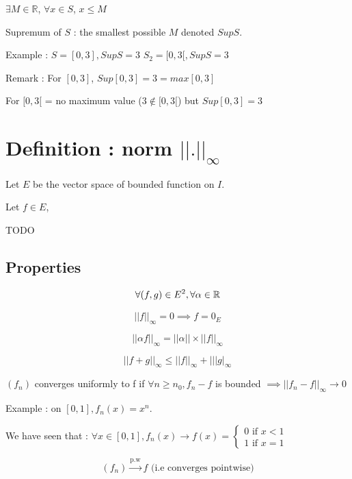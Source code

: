 \documentclass[a4paper,12pt]{article}
\renewcommand{\notin}{\mathrel{\not\in}}
\begin{document}
$\exists M \in \mathbb{R}$, $\forall x \in S$, $x \leq M$ \newline

Supremum of $S$ : the smallest possible $M$ denoted $Sup S$. \newline

Example : $S = [0,3], Sup S = 3$ \newline
$S_2 = [0,3[, Sup S = 3$ \newline

Remark : For $[0,3]$, $Sup [0,3] = 3 = max[0,3]$ \newline

For $[0,3[$ = no maximum value ($3 \notin [0,3[$) but $Sup [0,3] = 3$

\section{Definition : norm $||.||_\infty$}

Let $E$ be the vector space of bounded function on $I$. \newline

Let $f \in E$,

TODO 

\subsection{Properties}

\[
\forall (f,g) \in E^2, \forall \alpha \in \mathbb{R} \\
\]

\[
||f||_\infty = 0 \implies f = 0_E 
\]

\[
||\alpha f||_\infty = ||\alpha|| \times ||f||_\infty
\]

\[
||f + g||_\infty \leq ||f||_\infty + |||g|_\infty
\] \newline

$(f_n)$ converges uniformly to f if $\forall n \geq n_0, f_n - f$ is bounded $\implies ||f_n - f||_\infty \rightarrow 0$

Example : on $[0,1], f_n(x) = x^n$. \newline

We have seen that : $\forall x \in [0,1], f_n(x) \rightarrow f(x) = \begin{cases}
    0 \text{ if } x < 1 \\
    1 \text{ if } x = 1
\end{cases}$

\[(f_n) \overset{\text{p.w}}{\rightarrow} f \text{ (i.e converges pointwise)} \] 
\end{document}
